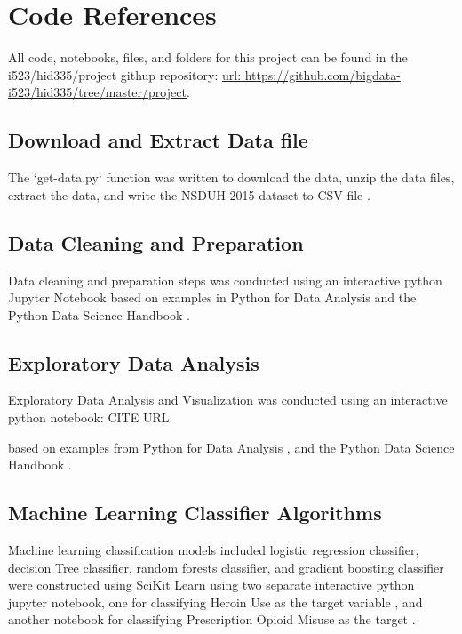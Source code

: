 \documentclass[sigconf]{acmart}
\begin{document}

 


\appendix

\section{Code References}
All code, notebooks, files, and folders for this project can be found in the
i523/hid335/project githup repository: 
\url{url:  https://github.com/bigdata-i523/hid335/tree/master/project}.

\subsection{Download and Extract Data file}

The `get-data.py` function was written to download the data, unzip the data
files, extract the data, and write the NSDUH-2015 dataset to CSV file 
\cite{getdata17}.

\subsection{Data Cleaning and Preparation}

Data cleaning and preparation steps was conducted using an interactive python 
Jupyter Notebook \cite{data17} based on examples in Python for Data Analysis 
\cite{mckinney17} and the Python Data Science Handbook \cite{vanderplas17}.

\subsection{Exploratory Data Analysis}

Exploratory Data Analysis and Visualization was conducted using an interactive
python notebook: CITE URL

based on examples from Python for Data Analysis \cite{mckinney17}, and the 
Python Data Science Handbook \cite{vanderplas17}.  

\subsection{Machine Learning Classifier Algorithms}
Machine learning classification models included logistic regression classifier, 
decision Tree classifier, random forests classifier, and gradient boosting 
classifier were constructed using SciKit Learn \cite{muller17, raschka17} 
using two separate interactive python jupyter notebook, one for classifying 
Heroin Use as the target variable \cite{classifyH}, and another notebook for 
classifying Prescription Opioid Misuse as the target \cite{classifyPRL}. 





%
\end{document}
